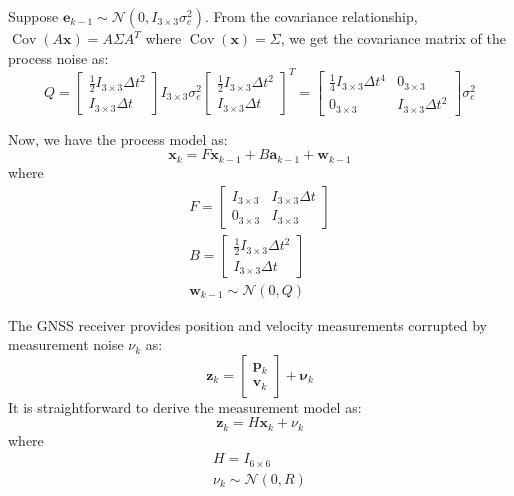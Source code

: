 \documentclass{beamer}
\begin{document}
\begin{frame}
    Suppose $\boldsymbol{e}_{k-1} \sim \mathcal{N}\left(0, I_{3 \times 3} \sigma_e^2\right)$. From the covariance relationship, $\operatorname{Cov}(A \boldsymbol{x})=A \Sigma A^T$ where $\operatorname{Cov}(\boldsymbol{x})=\Sigma$, we get the covariance matrix of the process noise as:
    $$
    Q=\left[\begin{array}{c}
    	\frac{1}{2} I_{3 \times 3} \Delta t^2 \\
    	I_{3 \times 3} \Delta t
    \end{array}\right] I_{3 \times 3} \sigma_e^2\left[\begin{array}{c}
    	\frac{1}{2} I_{3 \times 3} \Delta t^2 \\
    	I_{3 \times 3} \Delta t
    \end{array}\right]^T=\left[\begin{array}{cc}
    	\frac{1}{4} I_{3 \times 3} \Delta t^4 & 0_{3 \times 3} \\
    	0_{3 \times 3} & I_{3 \times 3} \Delta t^2
    \end{array}\right] \sigma_e^2
    $$
\end{frame}

\begin{frame}
	Now, we have the process model as:
	$$
	\boldsymbol{x}_k=F \boldsymbol{x}_{k-1}+B \boldsymbol{a}_{k-1}+\boldsymbol{w}_{k-1}
	$$
	where
	$$
	\begin{gathered}
		F=\left[\begin{array}{cc}
			I_{3 \times 3} & I_{3 \times 3} \Delta t \\
			0_{3 \times 3} & I_{3 \times 3}
		\end{array}\right] \\
		B=\left[\begin{array}{c}
			\frac{1}{2} I_{3 \times 3} \Delta t^2 \\
			I_{3 \times 3} \Delta t
		\end{array}\right] \\
		\boldsymbol{w}_{k-1} \sim \mathcal{N}(0, Q)
	\end{gathered}
	$$
	
\end{frame}

\begin{frame}
The GNSS receiver provides position and velocity measurements corrupted by measurement noise $\nu_k$ as:
$$
\mathbf{z}_k=\left[\begin{array}{c}
	\boldsymbol{p}_k \\
	\boldsymbol{v}_k
\end{array}\right]+\boldsymbol{\nu}_k
$$
It is straightforward to derive the measurement model as:
$$
\mathbf{z}_k=H \boldsymbol{x}_k+\nu_k
$$
where
$$
\begin{gathered}
	H=I_{6 \times 6} \\
	\nu_k \sim \mathcal{N}(0, R)
\end{gathered}
$$
\end{frame}
\end{document}
